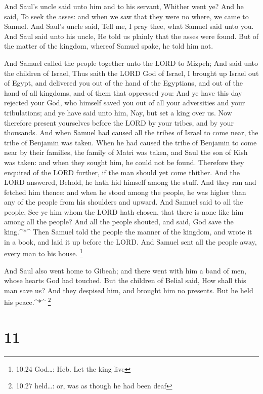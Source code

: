 And Saul's uncle said unto him and to his servant, Whither
went ye? And he said, To seek the asses: and when we saw that they were
no where, we came to Samuel.  And Saul's uncle said, Tell
me, I pray thee, what Samuel said unto you.  And Saul said
unto his uncle, He told us plainly that the asses were found. But of the
matter of the kingdom, whereof Samuel spake, he told him not.

 And Samuel called the people together unto the LORD to
Mizpeh;  And said unto the children of Israel, Thus saith
the LORD God of Israel, I brought up Israel out of Egypt, and delivered
you out of the hand of the Egyptians, and out of the hand of all
kingdoms, and of them that oppressed you:  And ye have this
day rejected your God, who himself saved you out of all your adversities
and your tribulations; and ye have said unto him, Nay, but set a king
over us. Now therefore present yourselves before the LORD by your
tribes, and by your thousands.  And when Samuel had caused
all the tribes of Israel to come near, the tribe of Benjamin was taken.
 When he had caused the tribe of Benjamin to come near by
their families, the family of Matri was taken, and Saul the son of Kish
was taken: and when they sought him, he could not be found.
 Therefore they enquired of the LORD further, if the man
should yet come thither. And the LORD answered, Behold, he hath hid
himself among the stuff.  And they ran and fetched him
thence: and when he stood among the people, he was higher than any of
the people from his shoulders and upward.  And Samuel said
to all the people, See ye him whom the LORD hath chosen, that there is
none like him among all the people? And all the people shouted, and
said, God save the king.\^{}*\^{}  Then Samuel told the
people the manner of the kingdom, and wrote it in a book, and laid it up
before the LORD. And Samuel sent all the people away, every man to his
house. \footnote{10.24 God\ldots: Heb. Let the king live}

 And Saul also went home to Gibeah; and there went with him
a band of men, whose hearts God had touched.  But the
children of Belial said, How shall this man save us? And they despised
him, and brought him no presents. But he held his peace.\^{}*\^{}
\footnote{10.27 held\ldots: or, was as though he had been deaf}

\hypertarget{section-10}{%
\section{11}\label{section-10}}

